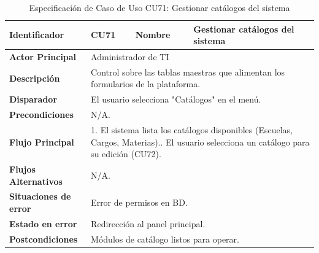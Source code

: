 \vspace{0.8cm}

\begingroup
\setlength{\parskip}{0pt}
\begin{longtable}{|p{3.5cm}|p{2cm}|p{2.5cm}|p{7cm}|}
\caption{Especificación de Caso de Uso CU71: Gestionar catálogos del sistema}
\label{tab:cu71} \\
\hline
\textbf{Identificador} & CU71 & \textbf{Nombre} & Gestionar catálogos del sistema \\ \hline
\textbf{Actor Principal} & \multicolumn{3}{p{11.5cm}|}{Administrador de TI} \\ \hline
\textbf{Descripción} & \multicolumn{3}{p{11.5cm}|}{Control sobre las tablas maestras que alimentan los formularios de la plataforma.} \\ \hline
\textbf{Disparador} & \multicolumn{3}{p{11.5cm}|}{El usuario selecciona "Catálogos" en el menú.} \\ \hline
\textbf{Precondiciones} & \multicolumn{3}{p{11.5cm}|}{N/A.} \\ \hline
\textbf{Flujo Principal} & \multicolumn{3}{p{11.5cm}|}{1. El sistema lista los catálogos disponibles (Escuelas, Cargos, Materias).\newline 2. El usuario selecciona un catálogo para su edición (CU72).} \\ \hline
\textbf{Flujos Alternativos} & \multicolumn{3}{p{11.5cm}|}{N/A.} \\ \hline
\textbf{Situaciones de error} & \multicolumn{3}{p{11.5cm}|}{Error de permisos en BD.} \\ \hline
\textbf{Estado en error} & \multicolumn{3}{p{11.5cm}|}{Redirección al panel principal.} \\ \hline
\textbf{Postcondiciones} & \multicolumn{3}{p{11.5cm}|}{Módulos de catálogo listos para operar.} \\ \hline
\end{longtable}
\endgroup

\vspace{0.8cm}

